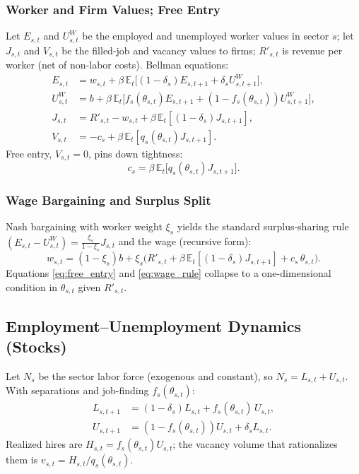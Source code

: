 \subsubsection*{Worker and Firm Values; Free Entry}
Let $E_{s,t}$ and $U_{s,t}^{W}$ be the employed and unemployed worker values in sector $s$; let $J_{s,t}$ and $V_{s,t}$ be the filled-job and vacancy values to firms; $R'_{s,t}$ is revenue per worker (net of non-labor costs). Bellman equations:
\begin{align}
	E_{s,t} &= w_{s,t} + \beta\,\mathbb{E}_t\big[(1-\delta_s)E_{s,t+1}+\delta_s U^W_{s,t+1}\big],\\
	U^W_{s,t} &= b + \beta\,\mathbb{E}_t\big[f_s(\theta_{s,t})E_{s,t+1} + (1-f_s(\theta_{s,t}))U^W_{s,t+1}\big],\\
	J_{s,t} &= R'_{s,t} - w_{s,t} + \beta\,\mathbb{E}_t[(1-\delta_s)J_{s,t+1}],\\
	V_{s,t} &= -c_s + \beta\,\mathbb{E}_t[q_s(\theta_{s,t})J_{s,t+1}].
\end{align}
Free entry, $V_{s,t}=0$, pins down tightness:
\begin{equation}
	c_s=\beta\,\mathbb{E}_t\!\big[q_s(\theta_{s,t})J_{s,t+1}\big].
	\label{eq:free_entry}
\end{equation}

\subsubsection*{Wage Bargaining and Surplus Split}
Nash bargaining with worker weight $\xi_s$ yields the standard surplus-sharing rule $(E_{s,t}-U^W_{s,t})=\frac{\xi_s}{1-\xi_s}J_{s,t}$ and the wage (recursive form):
\begin{equation}
	w_{s,t}=(1-\xi_s)b+\xi_s\Big(R'_{s,t}+\beta\,\mathbb{E}_t[(1-\delta_s)J_{s,t+1}] + c_s\,\theta_{s,t}\Big).
	\label{eq:wage_rule}
\end{equation}
Equations \eqref{eq:free_entry} and \eqref{eq:wage_rule} collapse to a one-dimensional condition in $\theta_{s,t}$ given $R'_{s,t}$.

\subsection*{Employment–Unemployment Dynamics (Stocks)}
\label{subsec:stocks}
Let $N_s$ be the sector labor force (exogenous and constant), so $N_s=L_{s,t}+U_{s,t}$. With separations and job-finding $f_s(\theta_{s,t})$:
\begin{align}
	L_{s,t+1} &=(1-\delta_s)L_{s,t} + f_s(\theta_{s,t})\,U_{s,t},
	\label{eq:employment_stock}\\
	U_{s,t+1} &=(1-f_s(\theta_{s,t}))U_{s,t} + \delta_s L_{s,t}.
	\label{eq:unemployment_stock}
\end{align}
Realized hires are $H_{s,t}=f_s(\theta_{s,t})U_{s,t}$; the vacancy volume that rationalizes them is $v_{s,t}=H_{s,t}/q_s(\theta_{s,t})$.

